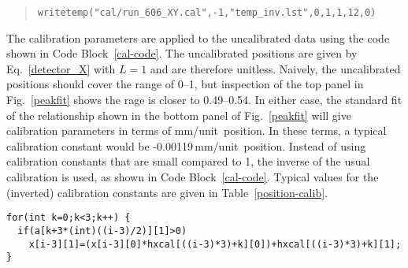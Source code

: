 \begin{quote}
\begin{Verbatim}[firstnumber=0]
writetemp("cal/run_606_XY.cal",-1,"temp_inv.lst",0,1,1,12,0)
\end{Verbatim}
\end{quote}


The calibration parameters are applied to the uncalibrated data using the code shown in Code Block~\ref{cal-code}. %
The uncalibrated positions are given by Eq.~\ref{detector_X} with $L=1$ and are therefore unitless.  Naively, the uncalibrated positions should cover the range of 0--1, but inspection of the top  panel in Fig.~\ref{peakfit} shows the rage is closer to 0.49--0.54. In either case, 
the standard fit of the relationship shown in the bottom panel of Fig.~\ref{peakfit} will give calibration parameters  in terms of mm/unit~position.
In these terms, a typical calibration constant would be -0.00119\,mm/unit~position. %
 Instead of using calibration constants that are small compared to 1, the inverse of the usual calibration is used, as shown in Code Block~\ref{cal-code}. Typical values for the (inverted) calibration constants are given in Table~\ref{position-calib}.
\vspace{0.5\baselineskip}
\par\noindent
\begin{minipage}{\linewidth}
\singlespace
\begin{lstlisting}[caption={Position calibration procedure. The index \texttt{i} runs over 3--6, corresponding to each of the four positions. Each position has a separate set of calibration parameters for each anode segment. The calibration parameters are stored in the array $12\times2$ \texttt{hxcal[][]}. Typical calibration parameters are given in Table~\ref{position-calib}.},label={cal-code}]
for(int k=0;k<3;k++) {
  if(a[k+3*(int)((i-3)/2)][1]>0)
    x[i-3][1]=(x[i-3][0]*hxcal[((i-3)*3)+k][0])+hxcal[((i-3)*3)+k][1];
}
\end{lstlisting}
\end{minipage}

